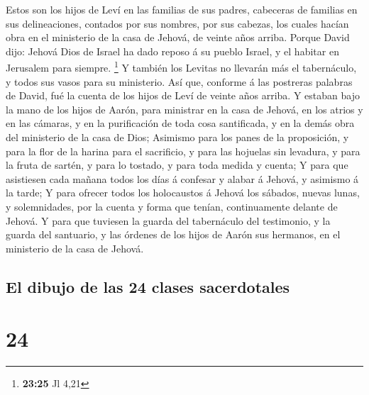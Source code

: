  Estos son los hijos de Leví en las familias de sus padres,
cabeceras de familias en sus delineaciones, contados por sus nombres,
por sus cabezas, los cuales hacían obra en el ministerio de la casa de
Jehová, de veinte años arriba.  Porque David dijo: Jehová
Dios de Israel ha dado reposo á su pueblo Israel, y el habitar en
Jerusalem para siempre. \footnote{\textbf{23:25} Jl 4,21} 
Y también los Levitas no llevarán más el tabernáculo, y todos sus vasos
para su ministerio.  Así que, conforme á las postreras
palabras de David, fué la cuenta de los hijos de Leví de veinte años
arriba.  Y estaban bajo la mano de los hijos de Aarón, para
ministrar en la casa de Jehová, en los atrios y en las cámaras, y en la
purificación de toda cosa santificada, y en la demás obra del ministerio
de la casa de Dios;  Asimismo para los panes de la
proposición, y para la flor de la harina para el sacrificio, y para las
hojuelas sin levadura, y para la fruta de sartén, y para lo tostado, y
para toda medida y cuenta;  Y para que asistiesen cada
mañana todos los días á confesar y alabar á Jehová, y asimismo á la
tarde;  Y para ofrecer todos los holocaustos á Jehová los
sábados, nuevas lunas, y solemnidades, por la cuenta y forma que tenían,
continuamente delante de Jehová.  Y para que tuviesen la
guarda del tabernáculo del testimonio, y la guarda del santuario, y las
órdenes de los hijos de Aarón sus hermanos, en el ministerio de la casa
de Jehová.

\hypertarget{el-dibujo-de-las-24-clases-sacerdotales}{%
\subsection{El dibujo de las 24 clases
sacerdotales}\label{el-dibujo-de-las-24-clases-sacerdotales}}

\hypertarget{section-23}{%
\section{24}\label{section-23}}


